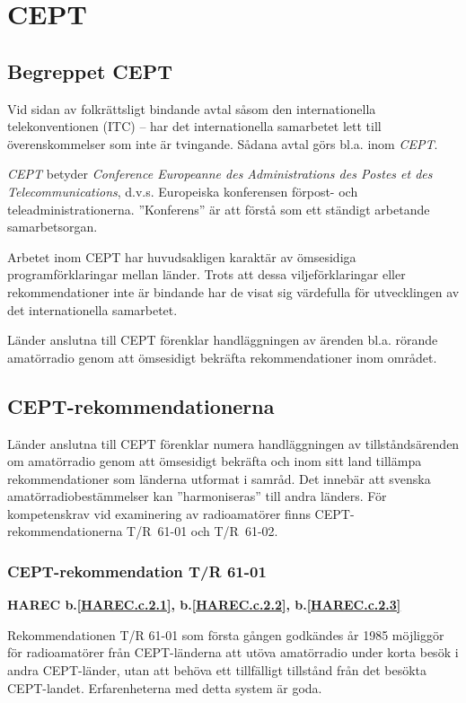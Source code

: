 \section{CEPT}

\subsection{Begreppet CEPT}

Vid sidan av folkrättsligt bindande avtal såsom den internationella
telekonventionen (ITC) -- har det internationella samarbetet lett till
överenskommelser som inte är tvingande. Sådana avtal görs bl.a. inom
\emph{CEPT}.

\emph{CEPT} betyder \emph{Conference Europeanne des Administrations
  des Postes et des Telecommunications}, d.v.s. Europeiska konferensen
förpost- och teleadministrationerna. ''Konferens'' är att förstå som
ett ständigt arbetande samarbetsorgan.

Arbetet inom CEPT har huvudsakligen karaktär av ömsesidiga
programförklaringar mellan länder. Trots att dessa viljeförklaringar
eller rekommendationer inte är bindande har de visat sig värdefulla
för utvecklingen av det internationella samarbetet.

Länder anslutna till CEPT förenklar handläggningen av ärenden
bl.a. rörande amatörradio genom att ömsesidigt bekräfta
rekommendationer inom området.

\subsection{CEPT-rekommendationerna}

Länder anslutna till CEPT förenklar numera handläggningen av
tillståndsärenden om amatörradio genom att ömsesidigt bekräfta och
inom sitt land tillämpa rekommendationer som länderna utformat i
samråd. Det innebär att svenska amatörradiobestämmelser kan
''harmoniseras'' till andra länders.  För kompetenskrav vid
examinering av radioamatörer finns CEPT-rekommendationerna T/R~61-01
och T/R~61-02.

\subsubsection{CEPT-rekommendation T/R 61-01}
\textbf{
HAREC b.\ref{HAREC.c.2.1}\label{myHAREC.c.2.1},
 b.\ref{HAREC.c.2.2}\label{myHAREC.c.2.2},
 b.\ref{HAREC.c.2.3}\label{myHAREC.c.2.3}
}

Rekommendationen T/R 61-01 som första gången godkändes år 1985 möjliggör för
radioamatörer från CEPT-länderna att utöva amatörradio under korta besök i
andra CEPT-länder, utan att behöva ett tillfälligt tillstånd från det besökta
CEPT-landet. Erfarenheterna med detta system är goda.

